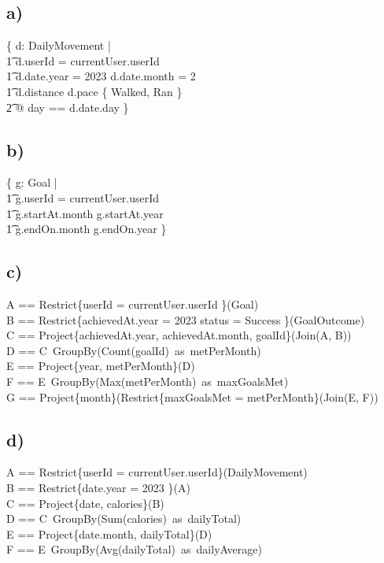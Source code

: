 \documentclass{article}
\begin{document}
\subsection*{\small a)}

\begin{zed}
\{ d: DailyMovement | \\
    \t1 d.userId = currentUser.userId \land \\
    \t1 d.date.year = 2023 \land d.date.month = 2 \land \\
    \t1 d.distance  \land d.pace \in \{ Walked, Ran \} \\
        \t2 @ \lblot day == d.date.day \rblot \}
\end{zed}

\subsection*{\small b)}
\begin{zed}
\{ g: Goal | \\
    \t1 g.userId = currentUser.userId \land \\
    \t1 g.startAt.month  \land g.startAt.year  \\
    \t1 g.endOn.month  \land g.endOn.year  \} \\
\end{zed}

\subsection*{\small c)}
\begin{zed}
A == Restrict\{userId = currentUser.userId \}(Goal) \\
B == Restrict\{achievedAt.year = 2023 \land status = Success \}(GoalOutcome) \\
C == Project\{achievedAt.year, achievedAt.month, goalId\}(Join(A, B)) \\
D == C\ GroupBy(Count(goalId)\ as\ metPerMonth) \\
E == Project\{year, metPerMonth\}(D) \\
F == E\ GroupBy(Max(metPerMonth)\ as\ maxGoalsMet) \\
G == Project\{month\}(Restrict\{maxGoalsMet = metPerMonth\}(Join(E, F)) \\
\end{zed}

\subsection*{\small d)}
\begin{zed}
A == Restrict\{userId = currentUser.userId\}(DailyMovement) \\
B == Restrict\{date.year = 2023 \}(A) \\
C == Project\{date, calories\}(B) \\
D == C\ GroupBy(Sum(calories)\ as\ dailyTotal) \\ 
E == Project\{date.month, dailyTotal\}(D) \\ 
F == E\ GroupBy(Avg(dailyTotal)\ as\ dailyAverage) \\
\end{zed}
\end{document}
